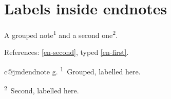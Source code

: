 \section{Labels inside endnotes}

A grouped note\textsuperscript{1} and a second
one\textsuperscript{2}.

References: \ref{en-second}, typed \cref{en-first}.



\bigskip
\begingroup\setlength{\parindent}{0pt}
\ifcsname c@jmdendnote\endcsname\else{}\fi
\expandafter\def\csname theHjmdendnote\endcsname{g.}
\noindent\setcounter{jmdendnote}{0}\textsuperscript{1}~Grouped, labelled \label{en-first} here.\par\smallskip
\noindent\setcounter{jmdendnote}{1}\textsuperscript{2}~Second, labelled \label{en-second} here.\par\smallskip
\endgroup

